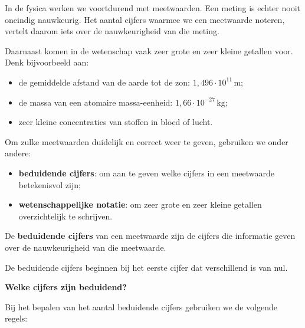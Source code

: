 \documentclass{ximera}
\begin{document}

In de fysica werken we voortdurend met meetwaarden. Een meting is echter nooit
oneindig nauwkeurig. Het aantal cijfers waarmee we een meetwaarde noteren,
vertelt daarom iets over de nauwkeurigheid van die meting.

Daarnaast komen in de wetenschap vaak zeer grote en zeer kleine getallen voor.
Denk bijvoorbeeld aan:

\begin{itemize}
    \item de gemiddelde afstand van de aarde tot de zon:
    $1{,}496 \cdot 10^{11}\,\si{\meter}$;

    \item de massa van een atomaire massa-eenheid:
    $1{,}66 \cdot 10^{-27}\,\si{\kilogram}$;

    \item zeer kleine concentraties van stoffen in bloed of lucht.
\end{itemize}

Om zulke meetwaarden duidelijk en correct weer te geven, gebruiken we onder
andere:

\begin{itemize}
    \item \textbf{beduidende cijfers}: om aan te geven welke cijfers in een
    meetwaarde betekenisvol zijn;

    \item \textbf{wetenschappelijke notatie}: om zeer grote en zeer kleine
    getallen overzichtelijk te schrijven.
\end{itemize}




\begin{definitie}
De \textbf{beduidende cijfers} van een meetwaarde zijn de cijfers die informatie
geven over de nauwkeurigheid van die meetwaarde.

De beduidende cijfers beginnen bij het eerste cijfer dat verschillend is van nul.
\end{definitie}


\textbf{Welke cijfers zijn beduidend?}

Bij het bepalen van het aantal beduidende cijfers gebruiken we de volgende regels:
\end{document}
